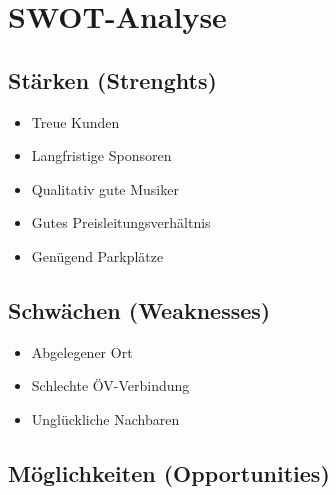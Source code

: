 \documentclass[a4paper, titlepage]{article}
\begin{document}
\section{SWOT-Analyse}
\subsection{Stärken (Strenghts)}
\begin{itemize}
  \item Treue Kunden
  \item Langfristige Sponsoren
  \item Qualitativ gute Musiker
  \item Gutes Preisleitungsverhältnis
  \item Genügend Parkplätze
\end{itemize}
\subsection{Schwächen (Weaknesses)}
\begin{itemize}
  \item Abgelegener Ort
  \item Schlechte ÖV-Verbindung
  \item Unglückliche Nachbaren
\end{itemize}
\subsection{Möglichkeiten (Opportunities)}
\end{document}
